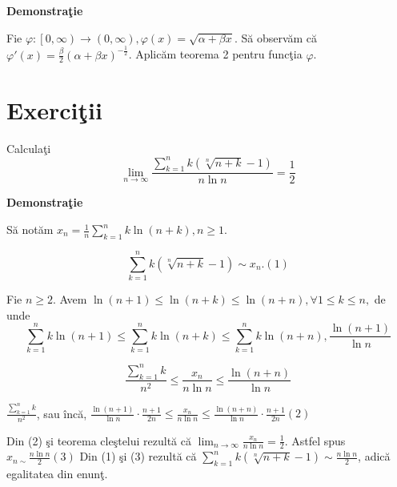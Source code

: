 \documentclass[a4paper,12pt,oneside]{report}
\begin{document}
\textbf{Demonstra\c tie}
 
Fie \(\varphi :\left [ 0,\infty  \right ) \to \left ( 0,\infty  \right ), \varphi \left ( x \right ) = \sqrt{\alpha +\beta x}\). S\u a observ\u am c\u a \({\varphi }'\left ( x \right ) = \frac{\beta }{2}\left ( \alpha +\beta x \right )^{-\frac{1}{2}}\). Aplic\u am teorema 2 pentru func\c tia \(\varphi\). 

\section{Exerci\c tii}

Calcula\c ti \begin{displaymath}
  \lim_{n \to \infty }\frac{\sum_{k=1}^{n}k\left ( \sqrt[n]{n+k} -1\right )}{n\ln n } = \frac{1}{2}
\end{displaymath}


\textbf{Demonstra\c tie} 

S\u a not\u am \(x_{n} = \frac{1}{n}\sum_{k=1}^{n} k \ln \left ( n+k \right ), n \geq 1\). 

\begin{displaymath}
  \sum_{k=1}^{n}k\left ( \sqrt[n]{n+k}-1 \right )\sim x_{n}. (1)
\end{displaymath}

Fie \(n\geq 2\). Avem \(\ln \left ( n+1 \right )\leq \ln \left ( n+k \right )\leq \ln \left ( n+n \right ), \forall 1\leq k\leq n,\) de unde 
\begin{displaymath}
  \sum_{k=1}^{n} k \ln \left ( n+1 \right )\leq \sum_{k=1}^{n}k \ln \left ( n+k \right )\leq \sum_{k=1}^{n} k \ln \left ( n+n \right ), \frac{\ln \left ( n+1 \right )}{\ln n }
\end{displaymath}

\begin{displaymath}
  \frac{\sum_{k=1}^{n}k}{n^{2}}\leq \frac{x_{n}}{n\ln n}\leq \frac{\ln \left ( n+n \right )}{\ln n }
\end{displaymath}

\(\frac{\sum_{k=1}^{n}k}{n^{2}}\), sau \^ inc\u a, 
\(\frac{\ln \left ( n+1 \right )}{\ln n} \cdot \frac{n+1}{2n}\leq \frac{x_{n}}{n\ln n }\leq \frac{\ln \left ( n+n \right )}{\ln n }\cdot \frac{n+1}{2n} (2)\)

Din (2) \c si teorema cle\c stelui rezult\u a c\u a \(\lim_{n \to \infty }\frac{x_{n}}{n\ln n } = \frac{1}{2}\). Astfel spus \(x_{n\sim }\frac{n\ln n }{2} (3)\)
Din (1) \c si (3) rezult\u a c\u a \(\sum_{k=1}^{n}k\left ( \sqrt[n]{n+k}-1 \right )\sim \frac{n\ln n }{2}\), adic\u a egalitatea din enun\c t. 
\end{document}
